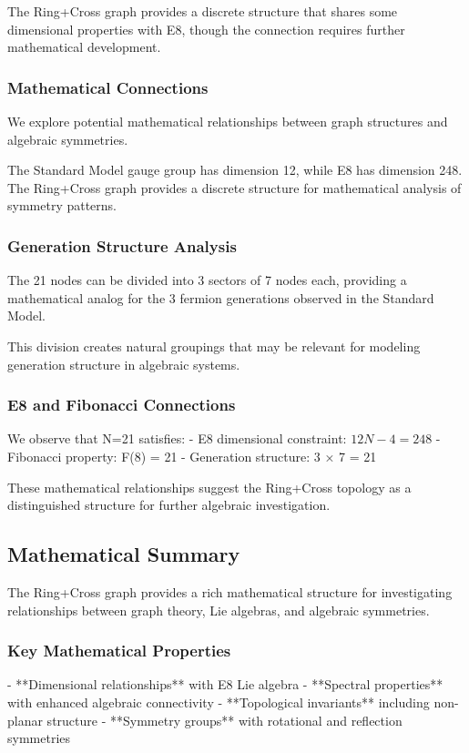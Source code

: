 \documentclass[12pt,a4paper]{article}
\begin{document}
The Ring+Cross graph provides a discrete structure that shares some dimensional properties with E8, though the connection requires further mathematical development.

\subsubsection{Mathematical Connections}
We explore potential mathematical relationships between graph structures and algebraic symmetries.

The Standard Model gauge group has dimension 12, while E8 has dimension 248. The Ring+Cross graph provides a discrete structure for mathematical analysis of symmetry patterns.

\subsubsection{Generation Structure Analysis}
The 21 nodes can be divided into 3 sectors of 7 nodes each, providing a mathematical analog for the 3 fermion generations observed in the Standard Model.

This division creates natural groupings that may be relevant for modeling generation structure in algebraic systems.

\subsubsection{E8 and Fibonacci Connections}
We observe that N=21 satisfies:
- E8 dimensional constraint: $12N - 4 = 248$
- Fibonacci property: F(8) = 21
- Generation structure: 3 × 7 = 21

These mathematical relationships suggest the Ring+Cross topology as a distinguished structure for further algebraic investigation.

\subsection{Mathematical Summary}
The Ring+Cross graph provides a rich mathematical structure for investigating relationships between graph theory, Lie algebras, and algebraic symmetries.

\subsubsection{Key Mathematical Properties}
- **Dimensional relationships** with E8 Lie algebra
- **Spectral properties** with enhanced algebraic connectivity
- **Topological invariants** including non-planar structure
- **Symmetry groups** with rotational and reflection symmetries
\end{document}
